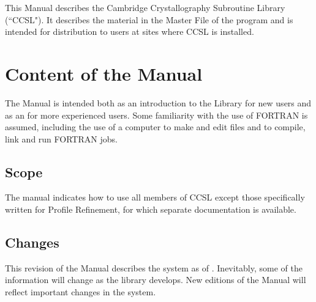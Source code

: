 %
\label{chap:1}%
This Manual describes the Cambridge Crystallography
Subroutine Library  (``CCSL").
It describes the material in the Master File of the program and is intended
for distribution to users at sites where CCSL is installed.
\pn 
\section{Content of the Manual} 
The Manual is intended both as an introduction to the Library for new
users and as an  for more experienced users.
Some familiarity with the use of FORTRAN is assumed, including the use of a
computer to make and edit files and to compile, link and run FORTRAN jobs.
\pn
% 
\subsection{Scope} 
The manual indicates how to use all members of CCSL except those 
specifically written
for Profile Refinement, for which separate documentation is available.
\pn
% 
\subsection{Changes}
% 
This revision of the Manual describes the system as of \versiondate. 
Inevitably, some of the information will change as the library develops.  New
editions of the Manual will reflect important changes in the system. \pn
% 
